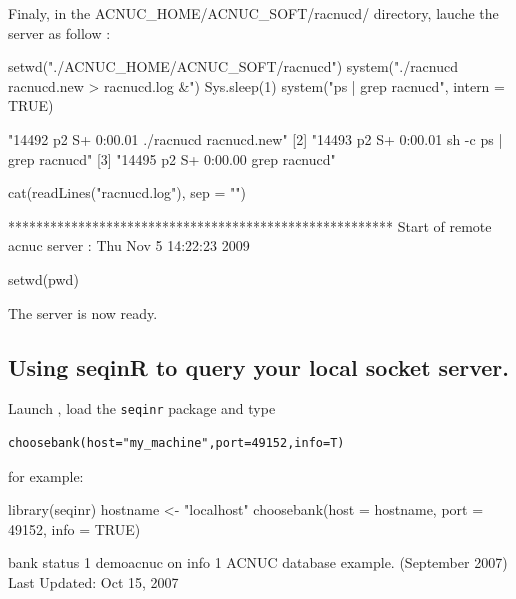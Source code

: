 \documentclass{article}
\begin{document}
Finaly, in the ACNUC\_HOME/ACNUC\_SOFT/racnucd/ directory, lauche the server as follow :

\begin{Schunk}
\begin{Sinput}
 setwd("./ACNUC_HOME/ACNUC_SOFT/racnucd")
 system("./racnucd racnucd.new > racnucd.log &")
 Sys.sleep(1)
 system("ps | grep racnucd", intern = TRUE)
\end{Sinput}
\begin{Soutput}
[1] "14492  p2  S+     0:00.01 ./racnucd racnucd.new"  
[2] "14493  p2  S+     0:00.01 sh -c ps | grep racnucd"
[3] "14495  p2  S+     0:00.00 grep racnucd"           
\end{Soutput}
\begin{Sinput}
 cat(readLines("racnucd.log"), sep = "\n")
\end{Sinput}
\begin{Soutput}
*******************************************************
Start of remote acnuc server : Thu Nov  5 14:22:23 2009
\end{Soutput}
\begin{Sinput}
 setwd(pwd)
\end{Sinput}
\end{Schunk}

The server is now ready.

\subsection{Using seqinR to query your local socket server.}

Launch \Rlogo{}, load the \texttt{seqinr} package  and type


\begin{verbatim}
choosebank(host="my_machine",port=49152,info=T)
\end{verbatim}

for example:


\begin{Schunk}
\begin{Sinput}
 library(seqinr)
 hostname <- "localhost"
 choosebank(host = hostname, port = 49152, info = TRUE)
\end{Sinput}
\begin{Soutput}
       bank status
1 demoacnuc     on
                                                                 info
1 ACNUC database example. (September 2007) Last Updated: Oct 15, 2007
\end{Soutput}
\end{Schunk}
\end{document}
